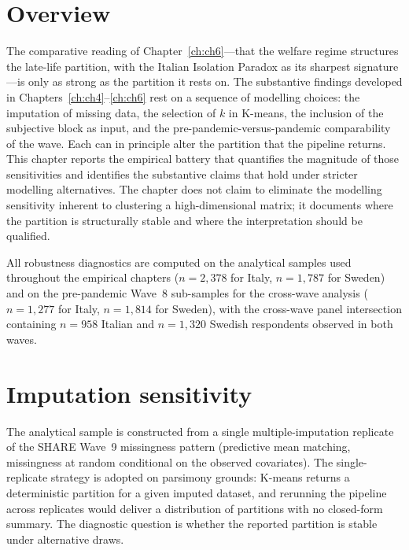 \label{ch:ch7}

\section{Overview}
\label{sec:ch7-overview}

The comparative reading of Chapter~\ref{ch:ch6}---that the welfare regime structures the late-life partition, with the Italian Isolation Paradox as its sharpest signature---is only as strong as the partition it rests on. The substantive findings developed in Chapters~\ref{ch:ch4}--\ref{ch:ch6} rest on a sequence of modelling choices: the imputation of missing data, the selection of $k$ in K-means, the inclusion of the subjective block as input, and the pre-pandemic-versus-pandemic comparability of the wave. Each can in principle alter the partition that the pipeline returns. This chapter reports the empirical battery that quantifies the magnitude of those sensitivities and identifies the substantive claims that hold under stricter modelling alternatives. The chapter does not claim to eliminate the modelling sensitivity inherent to clustering a high-dimensional matrix; it documents where the partition is structurally stable and where the interpretation should be qualified.

All robustness diagnostics are computed on the analytical samples used throughout the empirical chapters ($n = 2{,}378$ for Italy, $n = 1{,}787$ for Sweden) and on the pre-pandemic Wave~8 sub-samples for the cross-wave analysis ($n = 1{,}277$ for Italy, $n = 1{,}814$ for Sweden), with the cross-wave panel intersection containing $n = 958$ Italian and $n = 1{,}320$ Swedish respondents observed in both waves.

\section{Imputation sensitivity}
\label{sec:ch7-imputation}

The analytical sample is constructed from a single multiple-imputation replicate of the SHARE Wave~9 missingness pattern (predictive mean matching, missingness at random conditional on the observed covariates). The single-replicate strategy is adopted on parsimony grounds: K-means returns a deterministic partition for a given imputed dataset, and rerunning the pipeline across replicates would deliver a distribution of partitions with no closed-form summary. The diagnostic question is whether the reported partition is stable under alternative draws.

